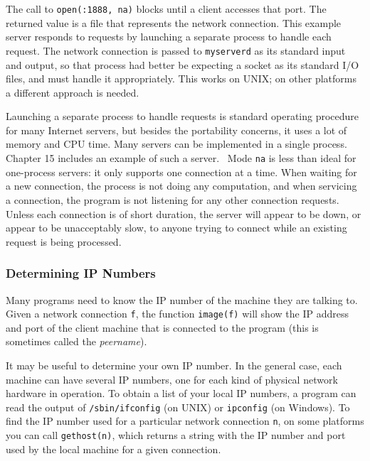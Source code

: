 The call to \texttt{open({\textquotedbl}:1888{\textquotedbl},
{\textquotedbl}na{\textquotedbl})} blocks until a client accesses that port.
The returned value is a file that represents the network
connection.
This example server
responds to requests by launching a separate process to handle each
request. The network connection is passed to \texttt{myserverd} as its
standard input and output, so that process had better be expecting a
socket as its standard I/O files, and must handle it appropriately.
This works on UNIX; on other platforms a different approach is needed.

Launching a separate process to handle requests is standard operating
procedure for many Internet servers, but besides the portability
concerns, it uses a lot of memory and CPU time. Many servers can be
implemented in a single process. Chapter 15 includes an example of such
a server. \ Mode \texttt{{\textquotedbl}na{\textquotedbl}} is less than
ideal for one-process servers: it only supports one connection at a
time. When waiting for a new connection, the process is not doing any
computation, and when servicing a connection, the program is not
listening for any other connection requests. Unless each connection is
of short duration, the server will appear to be down, or appear to be
unacceptably slow, to anyone trying to connect while an existing
request is being processed.

\subsubsection[Determining IP Numbers]{\sffamily Determining IP Numbers}

Many programs need to know the IP number of the
machine they are talking to. Given a network connection {\texttt f}, the
function \texttt{image(f)}
will show the IP address and port of the client machine that is connected
to the program (this is
sometimes called the \textit{peername}). 

It may be useful to determine your own IP number. In the general case,
each machine can have several IP numbers, one for each kind of
physical network hardware in operation.
To obtain a list of your local IP numbers, a program can read the output of
\texttt{/sbin/ifconfig} (on UNIX) or \texttt{ipconfig} (on Windows). To
find the IP number used for a particular network connection \texttt{n},
on some platforms you can call \texttt{gethost(n)}, which returns a string
with the IP number and port used by the local machine for a given connection.

